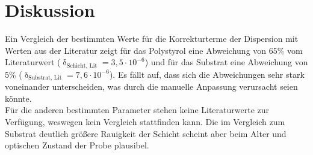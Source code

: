 \section{Diskussion}
Ein Vergleich der bestimmten Werte für die Korrekturterme der Dispersion mit Werten aus der Literatur zeigt für das Polystyrol
eine Abweichung von $65\%$ vom Literaturwert ($\updelta_\text{Schicht, Lit}=3{,}5\cdot10^{-6}$\cite{anleitung}) und für das Substrat eine Abweichung von $5\%$ ($\updelta_\text{Substrat, Lit}=7{,}6\cdot10^{-6}$\cite{anleitung}). Es fällt auf, dass sich die Abweichungen sehr stark voneinander unterscheiden, was durch die manuelle Anpassung verursacht seien könnte.\\ Für die anderen bestimmten Parameter stehen keine Literaturwerte zur Verfügung, weswegen kein Vergleich stattfinden kann. Die im Vergleich zum Substrat deutlich größere Rauigkeit der Schicht scheint aber beim Alter und optischen Zustand der Probe plausibel.
